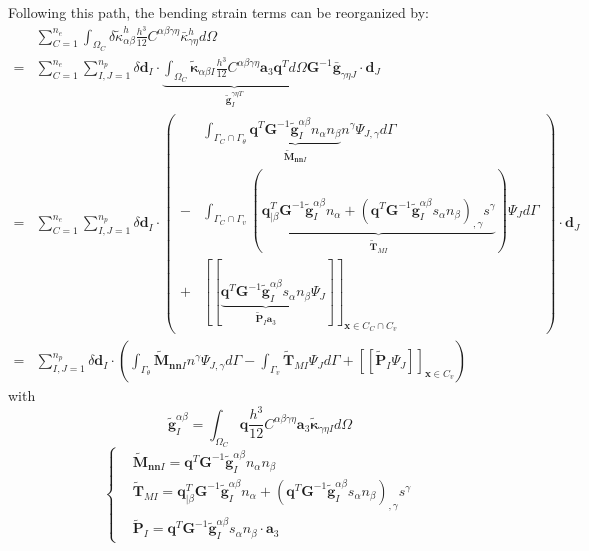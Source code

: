 Following this path, the bending strain terms can be reorganized by:
\begin{equation}
\begin{split}
&\sum_{C=1}^{n_e}\int_{\Omega_C} \delta \tilde \kappa_{\alpha\beta}^h \frac{h^3}{12}C^{\alpha\beta\gamma\eta}\bar \kappa^h_{\gamma\eta} d\Omega \\
        =&\sum_{C=1}^{n_e}\sum_{I,J=1}^{n_p}\delta \boldsymbol d_I \cdot \underbrace{\int_{\Omega_C} \tilde{\boldsymbol \kappa}_{\alpha\beta I} \frac{h^3}{12}C^{\alpha\beta\gamma\eta} \boldsymbol a_3 \boldsymbol q^T d\Omega}_{\tilde{\boldsymbol g}^{\gamma\eta T}_I} \boldsymbol G^{-1} \bar{\boldsymbol g}_{\gamma\eta J} \cdot \boldsymbol d_J \\
        =&\sum_{C=1}^{n_e}\sum_{I,J=1}^{n_p}\delta \boldsymbol d_I \cdot \left (
        \begin{split}
                &\int_{\Gamma_C\cap\Gamma_\theta} \underbrace{\boldsymbol q^T \boldsymbol G^{-1}\tilde{\boldsymbol g}^{\alpha\beta}_I n_\alpha n_\beta}_{\tilde{\boldsymbol M}_{\boldsymbol{nn} I}} n^\gamma\Psi_{J,\gamma} d\Gamma \\
                - &\int_{\Gamma_C\cap\Gamma_v} (\underbrace{\boldsymbol q^T_{\vert \beta} \boldsymbol G^{-1}\tilde{\boldsymbol g}^{\alpha\beta}_I n_\alpha + (\boldsymbol q^T \boldsymbol G^{-1}\tilde{\boldsymbol g}^{\alpha\beta}_I s_\alpha n_\beta)_{,\gamma}s^\gamma}_{\tilde{\boldsymbol T}_{M I}}) \Psi_J d\Gamma \\
                + &[[\underbrace{\boldsymbol q^T \boldsymbol G^{-1}\tilde{\boldsymbol g}^{\alpha\beta}_I s_\alpha n_\beta}_{\tilde{\boldsymbol P}_I \boldsymbol a_3} \Psi_J ]]_{\boldsymbol x\in C_C\cap C_v}
        \end{split}
       \right ) \cdot \boldsymbol d_J \\
       =&\sum_{I,J=1}^{n_p}\delta \boldsymbol d_I \cdot (
       \int_{\Gamma_\theta} \tilde{\boldsymbol M}_{\boldsymbol{nn} I} n^\gamma\Psi_{J,\gamma} d\Gamma
        - \int_{\Gamma_v} \tilde{\boldsymbol T}_{M I} \Psi_J d\Gamma
        + [[\tilde{\boldsymbol P}_I \Psi_J ]]_{\boldsymbol x\in C_v})
\end{split}
\end{equation}
with
\begin{equation}
\tilde{\boldsymbol g}^{\alpha\beta}_I = \int_{\Omega_C} \boldsymbol q \frac{h^3}{12}C^{\alpha\beta\gamma\eta} \boldsymbol a_3 \tilde{\boldsymbol \kappa}_{\gamma\eta I}d\Omega
\end{equation}
\begin{equation}
\left \{
\begin{split}
&\tilde{\boldsymbol M}_{\boldsymbol{nn} I} = \boldsymbol q^T \boldsymbol G^{-1}\tilde{\boldsymbol g}^{\alpha\beta}_I n_\alpha n_\beta \\
&\tilde{\boldsymbol T}_{M I} = \boldsymbol q^T_{\vert \beta} \boldsymbol G^{-1}\tilde{\boldsymbol g}^{\alpha\beta}_I n_\alpha + (\boldsymbol q^T \boldsymbol G^{-1}\tilde{\boldsymbol g}^{\alpha\beta}_I s_\alpha n_\beta)_{,\gamma}s^\gamma \\
&\tilde{\boldsymbol P}_I = \boldsymbol q^T \boldsymbol G^{-1}\tilde{\boldsymbol g}^{\alpha\beta}_I s_\alpha n_\beta \cdot \boldsymbol a_3
\end{split}
\right .
\end{equation}

